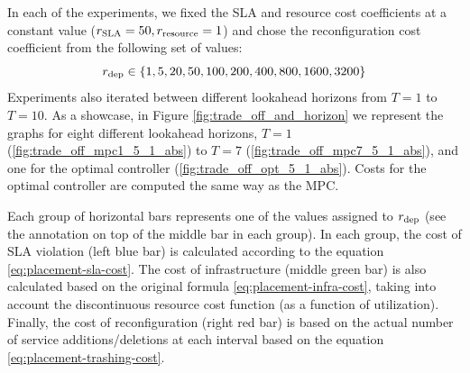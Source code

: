 	In each of the experiments, we fixed the SLA and resource cost coefficients at a constant value ($r_{\text{SLA}}=50, r_{\text{resource}}=1$) and chose the reconfiguration cost coefficient from the following set of values:
	\[r_{\text{dep}} \in \{1,5,20,50,100,200,400,800,1600,3200\}\]
	Experiments also iterated between different lookahead horizons from $T=1$ to $T=10$. 
	As a showcase, in Figure \ref{fig:trade_off_and_horizon} we represent the graphs for eight different lookahead horizons, $T=1$ (\ref{fig:trade_off_mpc1_5_1_abs}) to $T=7$ (\ref{fig:trade_off_mpc7_5_1_abs}), and one for the optimal controller (\ref{fig:trade_off_opt_5_1_abs}). Costs for the optimal controller are computed the same way as the MPC.
	
Each group of horizontal bars represents one of the values assigned to $r_{\text{dep}}$ (see the annotation on top of the middle bar in each group). 
In each group, the cost of SLA violation (left blue bar) is calculated according to the equation \ref{eq:placement-sla-cost}. 
The cost of infrastructure (middle green bar) is also calculated based on the original formula \ref{eq:placement-infra-cost}, taking into account the discontinuous resource cost function (as a function of utilization). 
Finally, the cost of reconfiguration (right red bar) is based on the actual number of service additions/deletions at each interval based on the equation \ref{eq:placement-trashing-cost}. 

